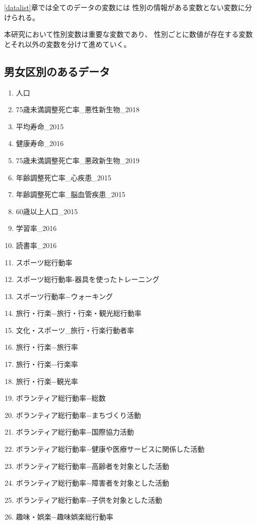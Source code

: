 \ref{datalist}章では全てのデータの変数には
性別の情報がある変数とない変数に分けられる。


本研究において性別変数は重要な変数であり、
性別ごとに数値が存在する変数とそれ以外の変数を分けて進めていく。

\subsection{男女区別のあるデータ}

\begin{multicols}{2}

\begin{enumerate}
  \item 人口
  \item 75歳未満調整死亡率\_悪性新生物\_2018
  \item 平均寿命\_2015
  \item 健康寿命\_2016
  \item 75歳未満調整死亡率\_悪政新生物\_2019
  \item 年齢調整死亡率\_心疾患\_2015
  \item 年齢調整死亡率\_脳血管疾患\_2015
  \item 60歳以上人口\_2015
  \item 学習率\_2016
  \item 読書率\_2016
  \item スポーツ総行動率
  \item スポーツ総行動率-器具を使ったトレーニング
  \item スポーツ行動率−ウォーキング
  \item 旅行・行楽−旅行・行楽・観光総行動率
  \item 文化・スポーツ\_旅行・行楽行動者率
  \item 旅行・行楽−旅行率
  \item 旅行・行楽−行楽率
  \item 旅行・行楽−観光率
  \item ボランティア総行動率−総数
  \item ボランティア総行動率−まちづくり活動
  \item ボランティア総行動率−国際協力活動
  \item ボランティア総行動率−健康や医療サービスに関係した活動
  \item ボランティア総行動率−高齢者を対象とした活動
  \item ボランティア総行動率−障害者を対象とした活動
  \item ボランティア総行動率−子供を対象とした活動
  \item 趣味・娯楽−趣味娯楽総行動率

\end{enumerate}
\end{multicols}
